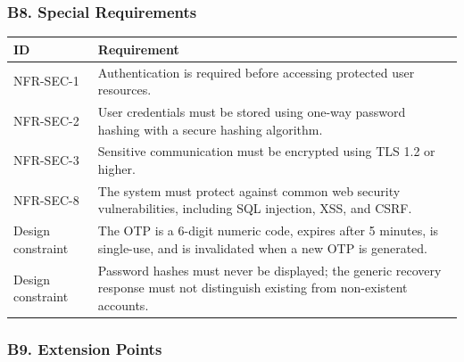 \documentclass[12pt]{article}
\renewcommand{\baselinestretch}{1.5}
\begin{document}
\hypertarget{sec:b8-special-requirements}{}
\subsubsection*{B8. Special Requirements}
\par\medskip

\begingroup
\small
\renewcommand{\baselinestretch}{1.0}\selectfont
\renewcommand{\arraystretch}{1.15}
\setlength{\tabcolsep}{6pt}
\begin{longtable}{|>{\raggedright\arraybackslash}p{}|>{\raggedright\arraybackslash}p{}|}
\hline
\textbf{ID} & \textbf{Requirement} \\ \hline
\endhead
NFR-SEC-1 & Authentication is required before accessing protected user resources. \\ \hline
NFR-SEC-2 & User credentials must be stored using one-way password hashing with a secure hashing algorithm. \\ \hline
NFR-SEC-3 & Sensitive communication must be encrypted using TLS 1.2 or higher. \\ \hline
NFR-SEC-8 & The system must protect against common web security vulnerabilities, including SQL injection, XSS, and CSRF. \\ \hline
Design constraint & The OTP is a 6-digit numeric code, expires after 5 minutes, is single-use, and is invalidated when a new OTP is generated. \\ \hline
Design constraint & Password hashes must never be displayed; the generic recovery response must not distinguish existing from non-existent accounts. \\ \hline
\end{longtable}
\endgroup
\par\medskip

\hypertarget{sec:b9-extension-points}{}
\subsubsection*{B9. Extension Points}
\par\medskip
\end{document}
